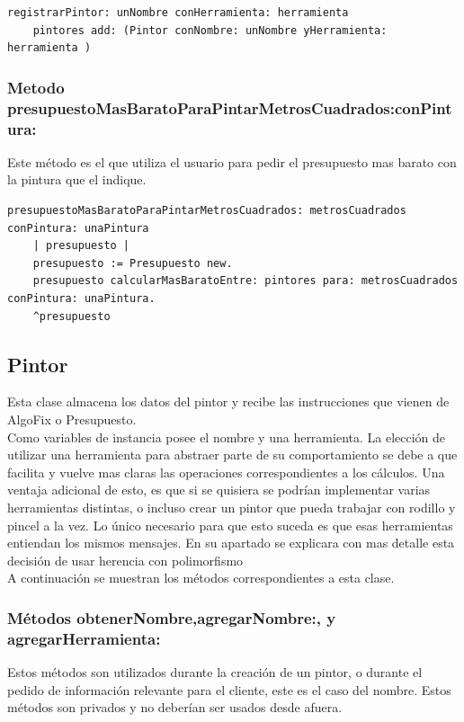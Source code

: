 \documentclass[titlepage,a4paper]{article}
\begin{document}
\begin{verbatim}
registrarPintor: unNombre conHerramienta: herramienta
    pintores add: (Pintor conNombre: unNombre yHerramienta: herramienta )
\end{verbatim}

\subsubsection*{Metodo presupuestoMasBaratoParaPintarMetrosCuadrados:conPintura:}
\indent Este método es el que utiliza el usuario para pedir el presupuesto mas barato con la pintura que el indique.
\begin{verbatim}
presupuestoMasBaratoParaPintarMetrosCuadrados: metrosCuadrados conPintura: unaPintura
    | presupuesto |
    presupuesto := Presupuesto new.
    presupuesto calcularMasBaratoEntre: pintores para: metrosCuadrados conPintura: unaPintura.
    ^presupuesto
\end{verbatim}



\subsection{Pintor}
\indent Esta clase almacena los datos del pintor y recibe las instrucciones que vienen de AlgoFix o Presupuesto. \\
\indent Como variables de instancia posee el nombre y una herramienta. La elección de utilizar una herramienta para abstraer parte de su comportamiento se debe a que facilita y vuelve mas claras las operaciones correspondientes a los cálculos. Una ventaja adicional de esto, es que si se quisiera se podrían implementar varias herramientas distintas, o incluso crear un pintor que pueda trabajar con rodillo y pincel a la vez. Lo único necesario para que esto suceda es que esas herramientas entiendan los mismos mensajes. En su apartado se explicara con mas detalle esta decisión de usar herencia con polimorfismo\\
\indent A continuación se muestran los métodos correspondientes a esta clase.
\medskip

\subsubsection*{Métodos obtenerNombre,agregarNombre:, y agregarHerramienta:}
\indent Estos métodos son utilizados durante la creación de un pintor, o durante el pedido de información relevante para el cliente, este es el caso del nombre. Estos métodos son privados y no deberían ser usados desde afuera.
\medskip
\end{document}
